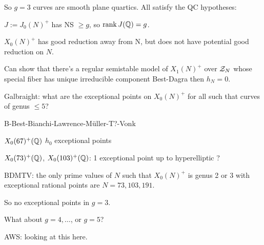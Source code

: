So $g=3$ curves are smooth plane quartics. All satisfy the QC hypotheses:

$J:= J_0(N)^+$ has NS $\geq g$, so $\operatorname{rank} J(\mathbb{Q})=g$.

$X_0(N)^+$ has good reduction away from N, but does not have potential good reduction on $N$. 

Can show that there's a regular semistable model of $X_1(N)^+$ over $\mathcal{Z}_N$ whose special fiber has unique irreducible component Best-Dagra then $h_N=0$.


Galbraight: what are the exceptional points on $X_0(N)^+$ for all such that curves of genus $ \leq 5$?


B-Best-Bianchi-Lawrence-M\"uller-T?-Vonk

$X_0(67)^+(\mathbb{Q})$ $h_0$ exceptional points

$X_0(73)^+(\mathbb{Q})$, $X_0(103)^+(\mathbb{Q})$: 1 exceptional point up to hyperelliptic ?

BDMTV: the only prime values of $N$ such that $X_0(N)^+$ is genus 2 or 3 with exceptional rational points are $N= 73,103,191$.

So no exceptional points in $g=3$.

What about $g=4,\ldots$, or $g=5$?

AWS: looking at this here. 






























